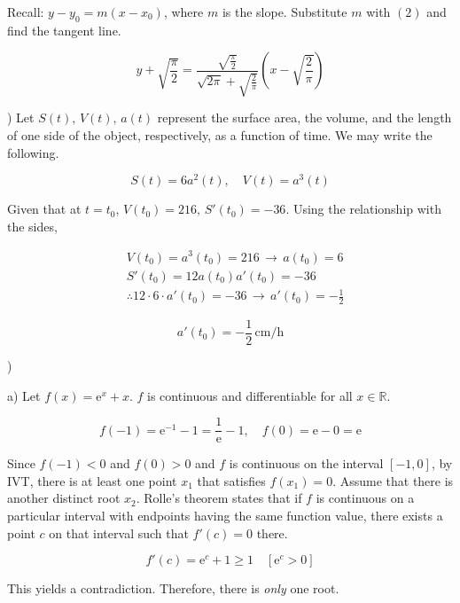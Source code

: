 \documentclass{article}
\begin{document}
\hfill

\noindent Recall: $y-y_0 = m(x-x_0)$, where $m$ is the slope. Substitute $m$ with $(2)$ and find the tangent line.

\[
\boxed{y+\sqrt{\frac{\pi}{2}} = \frac{\displaystyle\sqrt{\frac{\pi}{2}}}{ \displaystyle\sqrt{2\pi} +\sqrt{\frac{2}{\pi}}}\left(x-\sqrt{\frac{2}{\pi}}\right)}
\]

\hfill

) Let $S(t),\, V(t),\, a(t)$ represent the surface area, the volume, and the length of one side of the object, respectively, as a function of time. We may write the following.

\[
S(t) = 6a^2(t), \quad V(t) = a^3(t)
\]

\hfill

\noindent Given that at $t=t_0$, $V(t_0) = 216, \,S'(t_0)=-36$. Using the relationship with the sides,

\begin{align*}
&V(t_0) = a^3(t_0)= 216\,\rightarrow\, a(t_0) = 6\\
&S'(t_0) = 12a(t_0)a'(t_0)=-36\\
&\therefore 12\cdot6\cdot a'(t_0)=-36 \,\rightarrow\, a'(t_0)=-\frac12
\end{align*}

\[
\boxed{a'(t_0) = -\frac12\,\text{cm/h}}
\]

\newpage

)

\hfill

\noindent a) Let $f(x) = \mathrm{e}^x + x$. $f$ is continuous and differentiable for all $x\in\mathbb{R}$.

\[
    f(-1) = \mathrm{e}^{-1} -1 = \frac1{\mathrm{e}} - 1, \quad f(0) = \mathrm{e} - 0 = \mathrm{e}
\]

\hfill

\noindent Since $f(-1) < 0$ and $f(0) > 0$ and $f$ is continuous on the interval $[-1, 0]$, by IVT, there is at least one point $x_1$ that satisfies $f(x_1) = 0$. Assume that there is another distinct root $x_2$. Rolle's theorem states that if $f$ is continuous on a particular interval with endpoints having the same function value, there exists a point $c$ on that interval such that $f'(c) = 0$ there.

\[
f'(c) = \mathrm{e}^c + 1 \geq 1 \quad [\mathrm{e}^c > 0]
\]

\hfill

\noindent This yields a contradiction. Therefore, there is \textit{only} one root.
\end{document}
